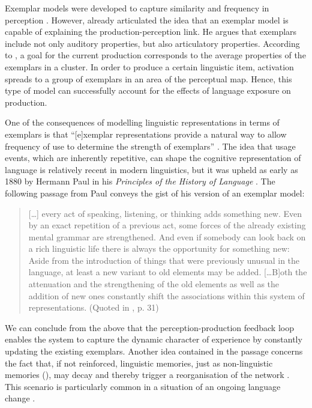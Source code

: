 Exemplar models were developed to capture similarity and frequency in perception \citep[cf.][]{pierrehumbert-2002}. However, already \citet{johnson97} articulated the idea that an exemplar model is capable of explaining the production-perception link. He argues that exemplars include not only auditory properties, but also articulatory properties. According to \citet{pierrehumbert-2002}, a goal for the current production corresponds to the average properties of the exemplars in a cluster. In order to produce a certain linguistic item, activation spreads to a group of exemplars in an area of the perceptual map. Hence, this type of model can successfully account for the effects of language exposure on production.

One of the consequences of modelling linguistic representations in terms of exemplars is that ``[e]xemplar representations provide a natural way to allow frequency of use to determine the strength of exemplars'' \citep[717]{bybee-repetition-2006}. The idea that usage events, which are inherently repetitive, can shape the cognitive representation of language is relatively recent in modern linguistics, but it was upheld as early as 1880 by Hermann Paul in his \textit{Principles of the History of Language} \citep[cf.][]{auer-paul}. The following passage from Paul conveys the gist of his version of an exemplar model:

\begin{quote}
[\dots] every act of speaking, listening, or thinking adds something new. Even by an exact repetition of a previous act, some forces of the already existing mental grammar are strengthened. And even if somebody can look back on a rich linguistic life there is always the opportunity for something new: Aside from the introduction of things that were previously unusual in the language, at least a new variant to old elements may be added. [\dots B]oth the attenuation and the strengthening of the old elements as well as the addition of new ones constantly shift the associations within this system of representations. (Quoted in \citealt{auer-etal-paul}, p. 31)
\end{quote}

\noindent We can conclude from the above that the perception-production feedback loop enables the system to capture the dynamic character of experience by constantly updating the existing exemplars. Another idea contained in the passage concerns the fact that, if not reinforced, linguistic memories, just as non-linguistic memories (\citealt[127]{sherwood-fundamentals-2012}), may decay  \citep{pierrehumbert-2001} and thereby trigger a reorganisation of the network \citep[cf.][]{bybee-beckner-2009}. This scenario is particularly common in a situation of an ongoing language change \citep[718]{bybee-repetition-2006}.

